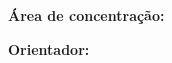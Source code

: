 
\begin{titlepage}
    \centering

    {\large \textbf{\MakeUppercase{\autor}} \par}

    \vfill

    {\Large \textbf{\MakeUppercase{\titulo}} \par}
    {\large \subtitulo \par}

    \vspace{2cm} %

    \begin{flushright}
        \begin{minipage}{0.5\textwidth}
            \small %
            \naturezatrabalho \par
            \vspace{0.5cm}
            \textbf{Área de concentração:} \areaconcentracao \par
            \textbf{Orientador:} \orientador \par
        \end{minipage}
    \end{flushright}

    \vfill

    {\large \textbf{\MakeUppercase{\local}} \par}
    {\large \textbf{\ano} \par}

\end{titlepage}
